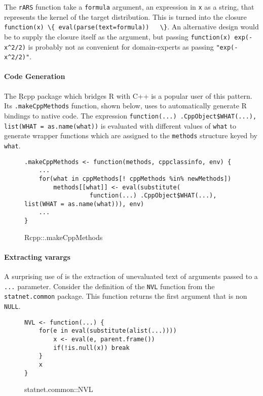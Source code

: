 \documentclass[screen,acmsmall]{acmart}%
\newcommand{\code}[1]{\lstinline |#1|\xspace}
\begin{document}
The \code{rARS} function take a \code{formula} argument, an expression in
\code{x} as a string, that represents the kernel of the target distribution.
This is turned into the closure \code{function(x) \{ eval(parse(text=formula))
  \}}. An alternative design would be to supply the closure itself as the
argument, but passing \code{function(x) exp(-x^2/2)} is probably not as
convenient for domain-experts as passing \code{"exp(-x^2/2)"}.

\paragraph{Code Generation} The \c{Rcpp} package which bridges R with C++ is a
popular user of this pattern. Its \code{.makeCppMethods} function, shown below,
uses \eval to automatically generate R bindings to native code. The expression
\code{function(...) .CppObject$WHAT(...), list(WHAT = as.name(what))} is
evaluated with different values of \code{what} to generate wrapper functions
which are assigned to the \code{methods} structure keyed by \code{what}.

\begin{figure}[h]
\begin{lstlisting}
.makeCppMethods <- function(methods, cppclassinfo, env) {
    ...
    for(what in cppMethods[! cppMethods %in% newMethods])
        methods[[what]] <- eval(substitute(
                  function(...) .CppObject$WHAT(...), list(WHAT = as.name(what))), env)
    ...
}
\end{lstlisting}
  \caption{Rcpp::.makeCppMethods}
\end{figure}

\paragraph{Extracting varargs} A surprising use of \eval is the
extraction of unevaluated text of arguments passed to a \code{...} parameter.
Consider the definition of the \code{NVL} function from the
\code{statnet.common} package. This function returns the first argument that is
non \code{NULL}.

\begin{figure}[h]
\begin{lstlisting}
NVL <- function(...) {
    for(e in eval(substitute(alist(...))))
        x <- eval(e, parent.frame())
        if(!is.null(x)) break
    }
    x
}
\end{lstlisting}
  \caption{statnet.common::NVL}
\end{figure}
\end{document}
